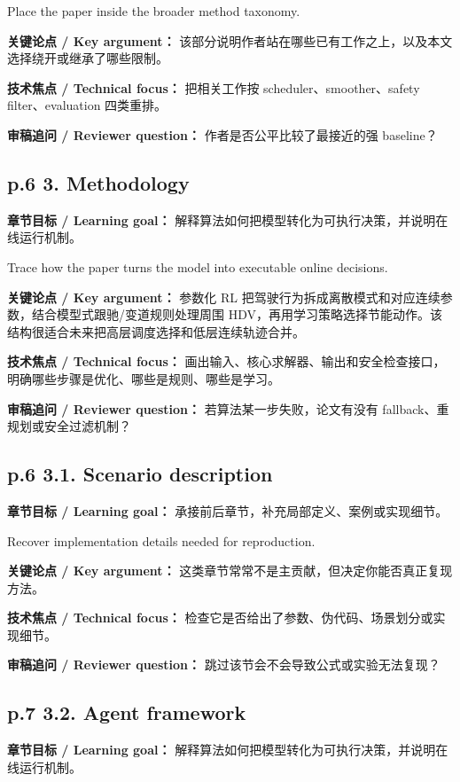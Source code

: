 \documentclass[UTF8,a4paper,11pt,fontset=fandol]{ctexart}
\begin{document}
Place the paper inside the broader method taxonomy.

\textbf{关键论点 / Key argument：} 该部分说明作者站在哪些已有工作之上，以及本文选择绕开或继承了哪些限制。

\textbf{技术焦点 / Technical focus：} 把相关工作按 scheduler、smoother、safety filter、evaluation 四类重排。

\textbf{审稿追问 / Reviewer question：} 作者是否公平比较了最接近的强 baseline？

\subsection*{p.6 3. Methodology}
\textbf{章节目标 / Learning goal：} 解释算法如何把模型转化为可执行决策，并说明在线运行机制。

Trace how the paper turns the model into executable online decisions.

\textbf{关键论点 / Key argument：} 参数化 RL 把驾驶行为拆成离散模式和对应连续参数，结合模型式跟驰/变道规则处理周围 HDV，再用学习策略选择节能动作。该结构很适合未来把高层调度选择和低层连续轨迹合并。

\textbf{技术焦点 / Technical focus：} 画出输入、核心求解器、输出和安全检查接口，明确哪些步骤是优化、哪些是规则、哪些是学习。

\textbf{审稿追问 / Reviewer question：} 若算法某一步失败，论文有没有 fallback、重规划或安全过滤机制？

\subsection*{p.6 3.1. Scenario description}
\textbf{章节目标 / Learning goal：} 承接前后章节，补充局部定义、案例或实现细节。

Recover implementation details needed for reproduction.

\textbf{关键论点 / Key argument：} 这类章节常常不是主贡献，但决定你能否真正复现方法。

\textbf{技术焦点 / Technical focus：} 检查它是否给出了参数、伪代码、场景划分或实现细节。

\textbf{审稿追问 / Reviewer question：} 跳过该节会不会导致公式或实验无法复现？

\subsection*{p.7 3.2. Agent framework}
\textbf{章节目标 / Learning goal：} 解释算法如何把模型转化为可执行决策，并说明在线运行机制。
\end{document}
